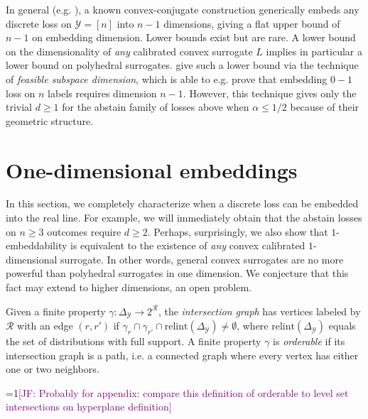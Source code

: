 \documentclass[anon]{colt2020} %
\newcommand{\Comments}{1}
\newcommand{\mynote}[2]{\ifnum\Comments=1\textcolor{#1}{#2}\fi}
\newcommand{\jessie}[1]{\mynote{purple}{[JF: #1]}}
\newcommand{\relint}{\mathrm{relint}}
\newcommand{\simplex}{\Delta_\Y}
\newcommand{\R}{\mathcal{R}}
\newcommand{\Y}{\mathcal{Y}}
\newtheorem{observation}{Observation}
\begin{document}
In general (e.g. \cite{finocchiaro2019embedding}), a known convex-conjugate construction generically embeds any discrete loss on $\Y = [n]$ into $n-1$ dimensions, giving a flat upper bound of $n-1$ on embedding dimension.
Lower bounds exist but are rare.
A lower bound on the dimensionality of \emph{any} calibrated convex surrogate $L$ implies in particular a lower bound on polyhedral surrogates.
\cite{ramaswamy2016convex} give such a lower bound via the technique of \emph{feasible subspace dimension}, which is able to e.g. prove that embedding $0-1$ loss on $n$ labels requires dimension $n-1$.
However, this technique gives only the trivial $d \geq 1$ for the abstain family of losses above when $\alpha \leq 1/2$ because of their geometric structure.


\section{One-dimensional embeddings}
\label{sec:1d}

In this section, we completely characterize when a discrete loss can be embedded into the real line.
For example, we will immediately obtain that the abstain losses on $n \geq 3$ outcomes require $d \geq 2$.
Perhaps, surprisingly, we also show that $1$-embeddability is equivalent to the existence of \emph{any} convex calibrated $1$-dimensional surrogate.
In other words, general convex surrogates are no more powerful than polyhedral surrogates in one dimension.
We conjecture that this fact may extend to higher dimensions, an open problem.

\begin{definition}
Given a finite property $\gamma: \simplex \to 2^{\R}$, the \emph{intersection graph} has vertices labeled by $\R$ with an edge $(r,r')$ if $\gamma_r \cap \gamma_{r'} \cap \relint(\simplex) \neq \emptyset$, where $\relint(\simplex)$ equals the set of distributions with full support.
  A finite property $\gamma$ is \emph{orderable} if its intersection graph is a path, i.e. a connected graph where every vertex has either one or two neighbors.
\end{definition}
\jessie{Probably for appendix: compare this definition of orderable to level set intersections on hyperplane definition}
\end{document}
